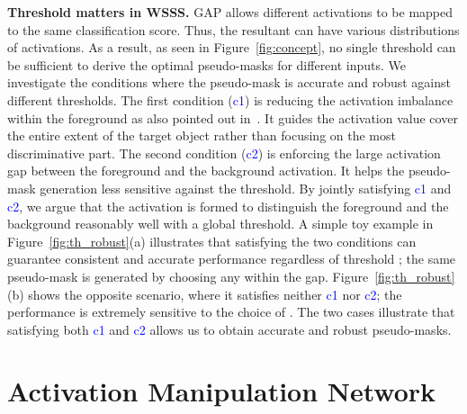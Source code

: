 \documentclass[10pt,twocolumn,letterpaper]{article}
\begin{document}
\vspace{1mm}
\noindent\textbf{Threshold matters in WSSS.} GAP allows different activations to be mapped to the same classification score. Thus, the resultant  can have various distributions of activations. As a result, as seen in Figure~\ref{fig:concept}, no single threshold can be sufficient to derive the optimal pseudo-masks for different inputs. We investigate the conditions where the pseudo-mask is accurate and robust against different thresholds. The first condition (\textcolor{blue}{c1}) is reducing the activation imbalance within the foreground as also pointed out in~\cite{Kweon_2021unlocking}. It guides the activation value cover the entire extent of the target object rather than focusing on the most discriminative part. The second condition (\textcolor{blue}{c2}) is enforcing the large activation gap between the foreground and the background activation. It helps the pseudo-mask generation less sensitive against the threshold. By jointly satisfying \textcolor{blue}{c1} and \textcolor{blue}{c2}, we argue that the activation is formed to distinguish the foreground and the background reasonably well with a global threshold. A simple toy example in Figure~\ref{fig:th_robust}(a) illustrates that satisfying the two conditions can guarantee consistent and accurate performance regardless of threshold ; the same pseudo-mask is generated by choosing any  within the gap. Figure~\ref{fig:th_robust}(b) shows the opposite scenario, where it satisfies neither \textcolor{blue}{c1} nor \textcolor{blue}{c2}; the performance is extremely sensitive to the choice of . The two cases illustrate that satisfying both \textcolor{blue}{c1} and \textcolor{blue}{c2} allows us to obtain accurate and robust pseudo-masks.


\section{Activation Manipulation Network}
\end{document}
